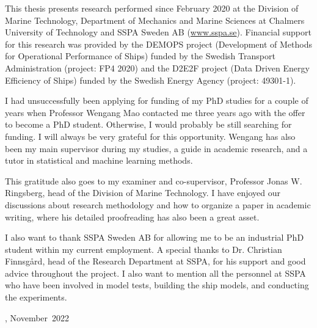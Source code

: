 This thesis presents research performed since February 2020 at the Division of Marine Technology, Department of Mechanics and Marine Sciences at Chalmers University of Technology and SSPA Sweden AB (\href{www.sspa.se}{www.sspa.se}). Financial support for this research was provided by the DEMOPS project (Development of Methods for Operational Performance of Ships) funded by the Swedish Transport Administration (project: FP4 2020) and the D2E2F project (Data Driven Energy Efficiency of Ships) funded by the Swedish Energy Agency (project: 49301-1).

I had unsuccessfully been applying for funding of my PhD studies for a couple of years when Professor Wengang Mao contacted me three years ago with the offer to become a PhD student. Otherwise, I would probably be still searching for funding. I will always be very grateful for this opportunity. Wengang has also been my main supervisor during my studies, a guide in academic research, and a tutor in statistical and machine learning methods.  

This gratitude also goes to my examiner and co-supervisor, Professor Jonas W. Ringsberg,
head of the Division of Marine Technology. I have enjoyed our discussions about research methodology and how to organize a paper in academic writing, where his detailed proofreading has also been a great asset.

I also want to thank SSPA Sweden AB for allowing me to be an industrial PhD student within my current employment. A special thanks to Dr. Christian Finnsgård, head of the Research Department at SSPA, for his support and good advice throughout the project. I also want to mention all the personnel at SSPA who have been involved in model tests, building the ship models, and conducting the experiments.

\vskip 2pc

\noindent \thesisauthor

\noindent \thesiscity, November\  2022  %

